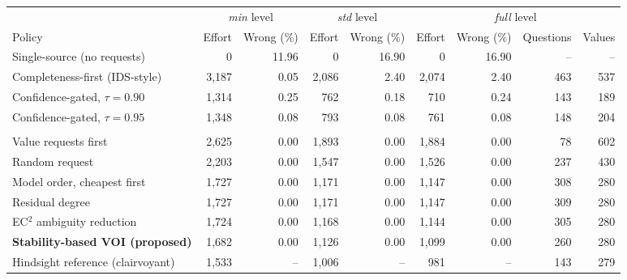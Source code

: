 \begin{tabular}{@{}lrrrrrrrr@{}}
\toprule
 & \multicolumn{2}{c}{\emph{min} level} & \multicolumn{2}{c}{\emph{std} level} & \multicolumn{4}{c}{\emph{full} level} \\
\cmidrule(lr){2-3}\cmidrule(lr){4-5}\cmidrule(l){6-9}
Policy & Effort & Wrong (\%) & Effort & Wrong (\%) & Effort & Wrong (\%) & Questions & Values \\
\midrule
Single-source (no requests) & 0 & 11.96 & 0 & 16.90 & 0 & 16.90 & -- & -- \\
Completeness-first (IDS-style) & 3,187 & 0.05 & 2,086 & 2.40 & 2,074 & 2.40 & 463 & 537 \\
\addlinespace
Confidence-gated, $\tau=0.90$ & 1,314 & 0.25 & 762 & 0.18 & 710 & 0.24 & 143 & 189 \\
Confidence-gated, $\tau=0.95$ & 1,348 & 0.08 & 793 & 0.08 & 761 & 0.08 & 148 & 204 \\
\addlinespace
\multicolumn{9}{@{}l}{\emph{Stability-gated policies}} \\
\quad Value requests first & 2,625 & 0.00 & 1,893 & 0.00 & 1,884 & 0.00 & 78 & 602 \\
\quad Random request & 2,203 & 0.00 & 1,547 & 0.00 & 1,526 & 0.00 & 237 & 430 \\
\quad Model order, cheapest first & 1,727 & 0.00 & 1,171 & 0.00 & 1,147 & 0.00 & 308 & 280 \\
\quad Residual degree & 1,727 & 0.00 & 1,171 & 0.00 & 1,147 & 0.00 & 309 & 280 \\
\quad EC$^2$ ambiguity reduction & 1,724 & 0.00 & 1,168 & 0.00 & 1,144 & 0.00 & 305 & 280 \\
\quad \textbf{Stability-based VOI (proposed)} & 1,682 & 0.00 & 1,126 & 0.00 & 1,099 & 0.00 & 260 & 280 \\
\addlinespace
Hindsight reference (clairvoyant) & 1,533 & -- & 1,006 & -- & 981 & -- & 143 & 279 \\
\bottomrule
\end{tabular}
